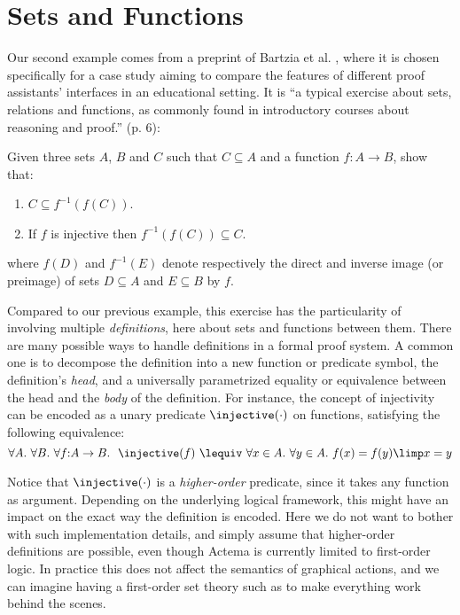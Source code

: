 \section{Sets and Functions}

Our second example comes from a preprint of Bartzia et al.
\cite{bartzia_proof_nodate}, where it is chosen specifically for a case study
aiming to compare the features of different proof assistants' interfaces in an
educational setting. It is ``a typical exercise about sets, relations and
functions, as commonly found in introductory courses about reasoning and
proof.'' (p. 6):

\begin{exercise}
  Given three sets $A$, $B$ and $C$ such that $C \subseteq A$ and a function $f
  : A \to B$, show that:
  \begin{enumerate}
    \item $C \subseteq f^{-1}(f(C))$.
    \item If $f$ is injective then $f^{-1}(f(C)) \subseteq C$.
  \end{enumerate}
  where $f(D)$ and $f^{-1}(E)$ denote respectively the direct and inverse image
  (or preimage) of sets $D \subseteq A$ and $E \subseteq B$ by $f$.
\end{exercise}

Compared to our previous example, this exercise has the particularity of
involving multiple \emph{definitions}, here about sets and functions between
them. There are many possible ways to handle definitions in a formal proof
system. A common one is to decompose the definition into a new function or
predicate symbol, the definition's \emph{head}, and a universally parametrized
equality or equivalence between the head and the \emph{body} of the definition.
For instance, the concept of injectivity can be encoded as a unary predicate
$\injective(\cdot)$ on functions, satisfying the following equivalence:
$$\forall A.\ \forall B.\ \forall f{:}A \to B.~\ \injective(f) ~\lequiv~ \forall x
\in A.\ \forall y \in A.\ f(x) = f(y) \limp x = y$$

Notice that $\injective(\cdot)$ is a \emph{higher-order} predicate, since it
takes any function as argument. Depending on the underlying logical framework,
this might have an impact on the exact way the definition is encoded. Here we do
not want to bother with such implementation details, and simply assume that
higher-order definitions are possible, even though Actema is currently limited
to first-order logic. In practice this does not affect the semantics of
graphical actions, and we can imagine having a first-order set theory such as
 to make everything work behind the scenes.

